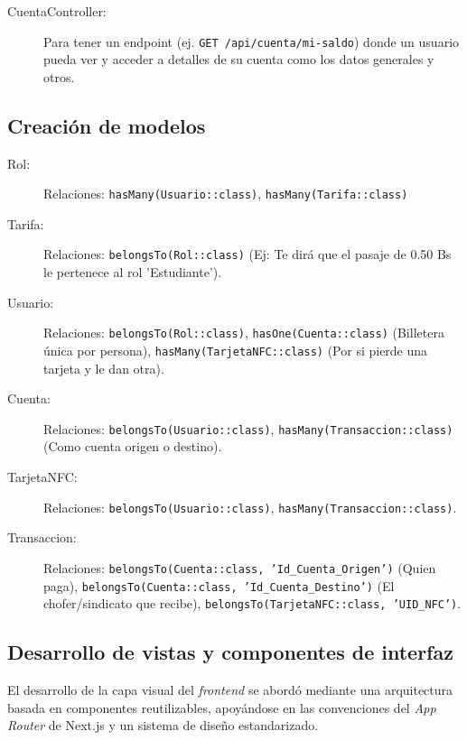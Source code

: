\documentclass[12pt,letterpaper]{report}
\begin{document}
\begin{description}
		\item[CuentaController:] Para tener un endpoint (ej. \texttt{GET /api/cuenta/mi-saldo}) donde un usuario pueda ver y acceder a detalles de su cuenta como los datos generales y otros.
	\end{description}
	
	\subsection{Creación de modelos}
	\begin{description}
		\item[Rol:] Relaciones: \texttt{hasMany(Usuario::class)}, \texttt{hasMany(Tarifa::class)}
		
		\item[Tarifa:] Relaciones: \texttt{belongsTo(Rol::class)} (Ej: Te dirá que el pasaje de 0.50 Bs le pertenece al rol 'Estudiante').
		
		\item[Usuario:] Relaciones: \texttt{belongsTo(Rol::class)}, \texttt{hasOne(Cuenta::class)} (Billetera única por persona), \texttt{hasMany(TarjetaNFC::class)} (Por si pierde una tarjeta y le dan otra).
		
		\item[Cuenta:] Relaciones: \texttt{belongsTo(Usuario::class)}, \texttt{hasMany(Transaccion::class)} (Como cuenta origen o destino).
		
		\item[TarjetaNFC:] Relaciones: \texttt{belongsTo(Usuario::class)}, \texttt{hasMany(Transaccion::class)}.
		
		\item[Transaccion:] Relaciones: \texttt{belongsTo(Cuenta::class, 'Id\_Cuenta\_Origen')} (Quien paga), \texttt{belongsTo(Cuenta::class, 'Id\_Cuenta\_Destino')} (El chofer/sindicato que recibe), \texttt{belongsTo(TarjetaNFC::class, 'UID\_NFC')}.
	\end{description}
	
	\subsection{Desarrollo de vistas y componentes de interfaz}
	
	El desarrollo de la capa visual del \textit{front\-end} se abordó mediante una arquitectura basada en componentes reutilizables, apoyándose en las convenciones del \textit{App Router} de Next.js y un sistema de diseño estandarizado.
	
\end{document}
